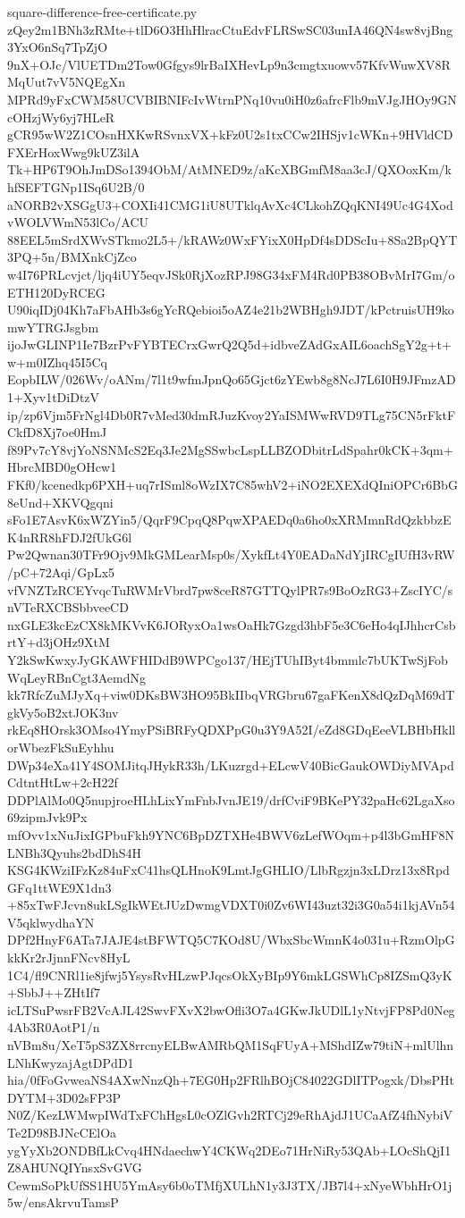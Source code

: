 \documentclass[11pt]{article}
\theoremstyle{definition}
\theoremstyle{remark}
\begin{document}
\begin{filecontents*}[overwrite]{square-difference-free-certificate.py}
zQey2m1BNh3zRMte+tlD6O3HhHlracCtuEdvFLRSwSC03unIA46QN4sw8vjBng3YxO6nSq7TpZjO
9nX+OJc/VlUETDm2Tow0Gfgys9lrBaIXHevLp9n3cmgtxuowv57KfvWuwXV8RMqUut7vV5NQEgXn
MPRd9yFxCWM58UCVBIBNIFcIvWtrnPNq10vu0iH0z6afrcFlb9mVJgJHOy9GNcOHzjWy6yj7HLeR
gCR95wW2Z1COsnHXKwRSvnxVX+kFz0U2s1txCCw2IHSjv1cWKn+9HVldCDFXErHoxWwg9kUZ3ilA
Tk+HP6T9OhJmDSo1394ObM/AtMNED9z/aKcXBGmfM8aa3cJ/QXOoxKm/khfSEFTGNp1ISq6U2B/0
aNORB2vXSGgU3+COXIi41CMG1iU8UTklqAvXc4CLkohZQqKNI49Uc4G4XodvWOLVWmN53lCo/ACU
88EEL5mSrdXWvSTkmo2L5+/kRAWz0WxFYixX0HpDf4sDDScIu+8Sa2BpQYT3PQ+5n/BMXnkCjZco
w4I76PRLcvjct/ljq4iUY5eqvJSk0RjXozRPJ98G34xFM4Rd0PB38OBvMrI7Gm/oETH120DyRCEG
U90iqIDj04Kh7aFbAHb3s6gYcRQebioi5oAZ4e21b2WBHgh9JDT/kPctruisUH9komwYTRGJsgbm
ijoJwGLINP1Ie7BzrPvFYBTECrxGwrQ2Q5d+idbveZAdGxAIL6oachSgY2g+t+w+m0IZhq45I5Cq
EopbILW/026Wv/oANm/7l1t9wfmJpnQo65Gjct6zYEwb8g8NcJ7L6I0H9JFmzAD1+Xyv1tDiDtzV
ip/zp6Vjm5FrNgl4Db0R7vMed30dmRJuzKvoy2YaISMWwRVD9TLg75CN5rFktFCkfD8Xj7oe0HmJ
f89Pv7cY8vjYoNSNMcS2Eq3Je2MgSSwbcLspLLBZODbitrLdSpahr0kCK+3qm+HbrcMBD0gOHcw1
FKf0/kcenedkp6PXH+uq7rISml8oWzIX7C85whV2+iNO2EXEXdQIniOPCr6BbG8eUnd+XKVQgqni
sFo1E7AsvK6xWZYin5/QqrF9CpqQ8PqwXPAEDq0a6ho0xXRMmnRdQzkbbzEK4nRR8hFDJ2fUkG6l
Pw2Qwnan30TFr9Ojv9MkGMLearMsp0s/XykfLt4Y0EADaNdYjIRCgIUfH3vRW/pC+72Aqi/GpLx5
vfVNZTzRCEYvqcTuRWMrVbrd7pw8ceR87GTTQylPR7s9BoOzRG3+ZscIYC/snVTeRXCBSbbveeCD
nxGLE3kcEzCX8kMKVvK6JORyxOa1wsOaHk7Gzgd3hbF5e3C6eHo4qIJhhcrCsbrtY+d3jOHz9XtM
Y2kSwKwxyJyGKAWFHIDdB9WPCgo137/HEjTUhIByt4bmmlc7bUKTwSjFobWqLeyRBnCgt3AemdNg
kk7RfcZuMJyXq+viw0DKsBW3HO95BkIIbqVRGbru67gaFKenX8dQzDqM69dTgkVy5oB2xtJOK3nv
rkEq8HOrsk3OMso4YmyPSiBRFyQDXPpG0u3Y9A52I/eZd8GDqEeeVLBHbHkllorWbezFkSuEyhhu
DWp34eXa41Y4SOMJitqJHykR33h/LKuzrgd+ELcwV40BicGaukOWDiyMVApdCdtntHtLw+2cH22f
DDPlAlMo0Q5nupjroeHLhLixYmFnbJvnJE19/drfCviF9BKePY32paHc62LgaXso69zipmJvk9Px
mfOvv1xNuJixIGPbuFkh9YNC6BpDZTXHe4BWV6zLefWOqm+p4l3bGmHF8NLNBh3Qyuhs2bdDhS4H
KSG4KWziIFzKz84uFxC41hsQLHnoK9LmtJgGHLIO/LlbRgzjn3xLDrz13x8RpdGFq1ttWE9X1dn3
+85xTwFJcvn8ukLSgIkWEtJUzDwmgVDXT0i0Zv6WI43uzt32i3G0a54i1kjAVn54V5qklwydhaYN
DPf2HnyF6ATa7JAJE4stBFWTQ5C7KOd8U/WbxSbcWmnK4o031u+RzmOlpGkkKr2rJjnnFNcv8HyL
1C4/fl9CNRl1ie8jfwj5YsysRvHLzwPJqcsOkXyBIp9Y6mkLGSWhCp8IZSmQ3yK+SbbJ++ZHtIf7
icLTSuPwsrFB2VcAJL42SwvFXvX2bwOfli3O7a4GKwJkUDlL1yNtvjFP8Pd0Neg4Ab3R0AotP1/n
nVBm8u/XeT5pS3ZX8rrcnyELBwAMRbQM1SqFUyA+MShdIZw79tiN+mlUlhnLNhKwyzajAgtDPdD1
hia/0fFoGvweaNS4AXwNnzQh+7EG0Hp2FRlhBOjC84022GDlITPogxk/DbsPHtDYTM+3D02sFP3P
N0Z/KezLWMwpIWdTxFChHgsL0cOZlGvh2RTCj29eRhAjdJ1UCaAfZ4fhNybiVTe2D98BJNcCElOa
ygYyXb2ONDBfLkCvq4HNdaechwY4CKWq2DEo71HrNiRy53QAb+LOcShQjI1Z8AHUNQIYnsxSvGVG
CewmSoPkUfSS1HU5YmAsy6b0oTMfjXULhN1y3J3TX/JB7l4+xNyeWbhHrO1j5w/ensAkrvuTamsP

\end{filecontents*}
\end{document}
